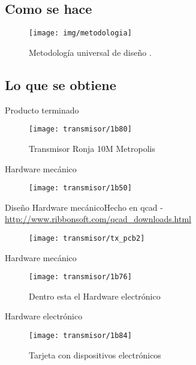 \documentclass{beamer}
\begin{document}
\subsection{Como se hace}

\begin{frame}
  \begin{figure}
    \texttt{[image: img/metodologia]}
    \caption{Metodología universal de diseño \cite{Guillermo}.}
    \label{fig:metodologia}
  \end{figure}
\end{frame}

\subsection{Lo que se obtiene}

\begin{frame}{Producto terminado}
  \begin{figure}
    \texttt{[image: transmisor/1b80]}
    \caption{Transmisor Ronja 10M Metropolis}
  \end{figure}
\end{frame}

\begin{frame}{Hardware mecánico}
  \begin{figure}
    \texttt{[image: transmisor/1b50]}
  \end{figure}
\end{frame}

\begin{frame}{Diseño Hardware mecánico}{Hecho en \alert{qcad} - \url{http://www.ribbonsoft.com/qcad_downloads.html}}
  \begin{figure}
    \texttt{[image: transmisor/tx\_pcb2]}
  \end{figure}
\end{frame}

\begin{frame}{Hardware mecánico}
  \begin{figure}
    \texttt{[image: transmisor/1b76]}
    \caption{Dentro esta el Hardware electrónico}
  \end{figure}
\end{frame}

\begin{frame}{Hardware electrónico}
  \begin{figure}
    \texttt{[image: transmisor/1b84]}
    \caption{Tarjeta con dispositivos electrónicos}
  \end{figure}
\end{frame}
\end{document}
